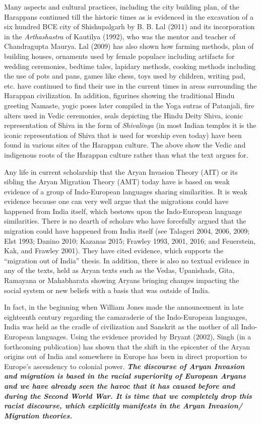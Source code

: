 Many aspects and cultural practices, including the city building plan, of the Harappans continued till the historic times as is evidenced in the excavation of a six hundred BCE city of Shishupalgarh by B. B. Lal (2011) and its incorporation in the \textit{Arthashastra} of Kautilya (1992), who was the mentor and teacher of Chandragupta Maurya. Lal (2009) has also shown how farming methods, plan of building houses, ornaments used by female populace including artifacts for wedding ceremonies, bedtime tales, lapidary methods, cooking methods including the use of pots and pans, games like chess, toys used by children, writing pad, etc. have continued to find their use in the current times in areas surrounding the Harappan civilization. In addition, figurines showing the traditional Hindu greeting Namaste, yogic poses later compiled in the Yoga sutras of Patanjali, fire alters used in Vedic ceremonies, seals depicting the Hindu Deity Shiva, iconic representation of Shiva in the form of \textit{Shivalinga} (in most Indian temples it is the iconic representation of Shiva that is used for worship even today) have been found in various sites of the Harappan culture. The above show the Vedic and indigenous roots of the Harappan culture rather than what the text argues for. 

Any life in current scholarship that the Aryan Invasion Theory (AIT) or its sibling the Aryan Migration Theory (AMT) today have is based on weak evidence of a group of Indo-European languages sharing similarities. It is weak evidence because one can very well argue that the migrations could have happened from India itself, which bestows upon the Indo-European language similarities. There is no dearth of scholars who have forcefully argued that the migration could have happened from India itself (see Talageri 2004, 2006, 2009; Elst 1993; Danino 2010; Kazanas 2015; Frawley 1993, 2001, 2016; and Feuerstein, Kak, and Frawley 2001). They have cited evidence, which supports the “migration out of India” thesis. In addition, there is also no textual evidence in any of the texts, held as Aryan texts such as the Vedas, Upanishads, Gita, Ramayana or Mahabharata showing Aryans bringing changes impacting the social system or new beliefs with a basis that was outside of India.

In fact, in the beginning when William Jones made the announcement in late eighteenth century regarding the camaraderie of the Indo-European languages, India was held as the cradle of civilization and Sanskrit as the mother of all Indo-European languages. Using the evidence provided by Bryant (2002), Singh (in a forthcoming publication) has shown that the shift in the epicenter of the Aryan origins out of India and somewhere in Europe has been in direct proportion to Europe’s ascendency to colonial power. \textit{\textbf{The discourse of Aryan Invasion and migration is based in the racial superiority of European Aryans and we have already seen the havoc that it has caused before and during the Second World War. It is time that we completely drop this racist discourse, which explicitly manifests in the Aryan Invasion/ Migration theories.}} 

